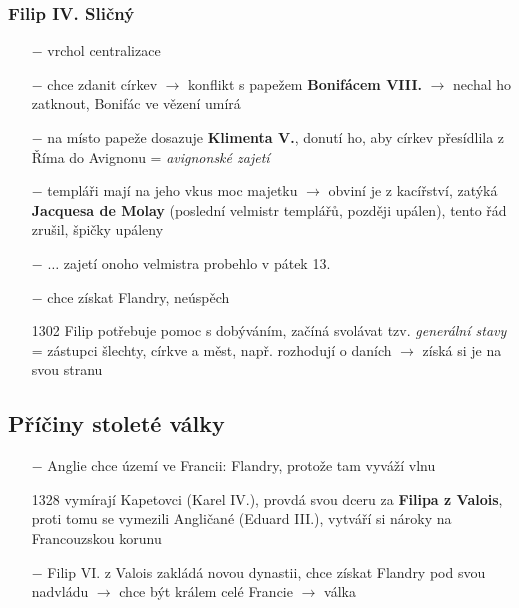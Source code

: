 \documentclass{article}
\begin{document}
\subsubsection*{Filip IV. Sličný}
\begin{itemize}
    \vspace{-0.5em}
    \setlength\itemsep{0.15em}
    \item[$-$] vrchol centralizace
    \item[$-$] chce zdanit církev $\rightarrow$ konflikt s papežem \textbf{Bonifácem VIII.} $\rightarrow$ nechal ho zatknout, Bonifác ve vězení umírá
    \item[$-$] na místo papeže dosazuje \textbf{Klimenta V.}, donutí ho, aby církev přesídlila z Říma do Avignonu = \textit{avignonské zajetí}
    \item[$-$] templáři mají na jeho vkus moc majetku $\rightarrow$ obviní je z kacířství, zatýká \textbf{Jacquesa de Molay} (poslední velmistr templářů, později upálen), tento řád zrušil, špičky upáleny
    \item[$-$]  $\dots$ zajetí onoho velmistra probehlo v pátek 13.
    \item[$-$] chce získat Flandry, neúspěch
    \item[1302] Filip potřebuje pomoc s dobýváním, začíná svolávat tzv. \textit{generální stavy} = zástupci šlechty, církve a měst, např. rozhodují o daních $\rightarrow$ získá si je na svou stranu
\end{itemize}


\subsection*{Příčiny stoleté války}
\begin{itemize}
    \vspace{-0.5em}
    \setlength\itemsep{0.15em}
    \item[$-$] Anglie chce území ve Francii: Flandry, protože tam vyváží vlnu
    \item[1328] vymírají Kapetovci (Karel IV.), provdá svou dceru za \textbf{Filipa z Valois}, proti tomu se vymezili Angličané (Eduard III.), vytváří si nároky na Francouzskou korunu
    \item[$-$] Filip VI. z Valois zakládá novou dynastii, chce získat Flandry pod svou nadvládu $\rightarrow$ chce být králem celé Francie $\rightarrow$ válka
\end{itemize}
\end{document}
